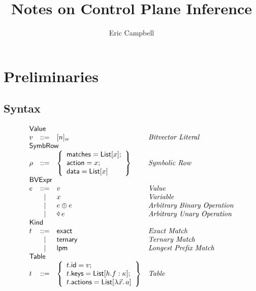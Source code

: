 \documentclass{article}
\title{Notes on Control Plane Inference}
\author{Eric Campbell}
\newcommand{\binop}{\mathbin{\oplus}}
\newcommand{\unop}{\mathop{\text{\pointer}}}
\newcommand{\Value}{\mathsf{Value}}
\newcommand{\BVExpr}{\mathsf{BVExpr}}
\newcommand{\Table}{\mathsf{Table}}
\newcommand{\List}{\mathsf{List}}
\newcommand{\SymbRow}{\mathsf{SymbRow}}
\newcommand{\Kind}{\mathsf{Kind}}
\newcommand{\matches}{\mathsf{matches}}
\newcommand{\action}{\mathsf{action}}
\newcommand{\actions}{\mathsf{actions}}
\newcommand{\keys}{\mathsf{keys}}
\newcommand{\data}{\mathsf{data}}
\newcommand{\id}{\mathsf{id}}
\newcommand{\exact}{\ensuremath{\mathsf{exact}}}
\newcommand{\ternary}{\ensuremath{\mathsf{ternary}}}
\newcommand{\lpm}{\ensuremath{\mathsf{lpm}}}
\theoremstyle{plain}
\theoremstyle{definition}
\theoremstyle{remark}
\begin{document}
\maketitle

\section{Preliminaries}

\subsection{Syntax}

\begin{figure}[htp]
  \[\begin{array}{lclll}
    \multicolumn{3}{l}{\Value} \\
    v & ::= & [n]_w  & \textit{Bitvector Literal} \\
    \multicolumn{3}{l}{\SymbRow} \\
    \rho & ::= & \left\{
    \begin{array}{l}
      \matches = \List[x];\\
      \action = x;\\
      \data = \List[x]
    \end{array}\right\} & \textit{Symbolic Row} \\
    \multicolumn{3}{l}{\BVExpr} \\
    e & ::= & v & \textit{Value} \\
      & \mid & x & \textit{Variable}\\
      & \mid & e \binop e & \textit{Arbitrary Binary Operation}\\
    & \mid & \unop e & \textit{Arbitrary Unary Operation} \\
    \multicolumn{3}{l}{\Kind} \\
    t & ::= & \exact  & \textit{Exact Match}\\
    & \mid & \ternary & \textit{Ternary Match} \\
    & \mid & \lpm & \textit{Longest Prefix Match} \\
    \multicolumn{3}{l}{\Table} \\
    t & ::= & \left\{\begin{array}{l}
    t.\id = v; \\
    t.\keys = \List[h.f : \kappa]; \\
    t.\actions = \List[\lambda \vec x.\,a]\\
    \end{array}\right\} & \textit{Table}\\

\end{array}\]
\end{figure}
\end{document}
